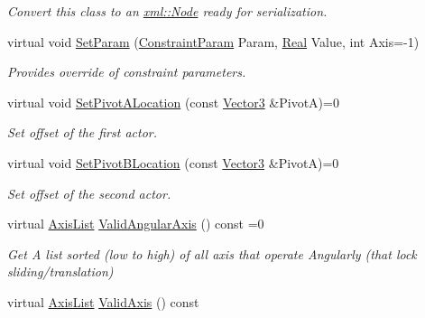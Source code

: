 \begin{DoxyCompactItemize}
\begin{DoxyCompactList}\small\item\em Convert this class to an \hyperlink{classMezzanine_1_1xml_1_1Node}{xml::Node} ready for serialization. \item\end{DoxyCompactList}\item 
virtual void \hyperlink{classMezzanine_1_1TypedConstraint_aacb29d66ce974798bbc902d49a3025cc}{SetParam} (\hyperlink{namespaceMezzanine_a6c62e8c2938fb203eb7a7072c12176f4}{ConstraintParam} Param, \hyperlink{namespaceMezzanine_a726731b1a7df72bf3583e4a97282c6f6}{Real} Value, int Axis=-\/1)
\begin{DoxyCompactList}\small\item\em Provides override of constraint parameters. \item\end{DoxyCompactList}\item 
virtual void \hyperlink{classMezzanine_1_1TypedConstraint_a09aacdc6f424623cc3a2fdad9c1d0caf}{SetPivotALocation} (const \hyperlink{classMezzanine_1_1Vector3}{Vector3} \&PivotA)=0
\begin{DoxyCompactList}\small\item\em Set offset of the first actor. \item\end{DoxyCompactList}\item 
virtual void \hyperlink{classMezzanine_1_1TypedConstraint_ad59aa55a0e4b8aa107db9c9460b57ec3}{SetPivotBLocation} (const \hyperlink{classMezzanine_1_1Vector3}{Vector3} \&PivotA)=0
\begin{DoxyCompactList}\small\item\em Set offset of the second actor. \item\end{DoxyCompactList}\item 
virtual \hyperlink{classMezzanine_1_1TypedConstraint_ac6b8e0839cd686f73d0c9e9ad5db47a4}{AxisList} \hyperlink{classMezzanine_1_1TypedConstraint_a09ecca761c4af51a8b41c056f6b15b30}{ValidAngularAxis} () const =0
\begin{DoxyCompactList}\small\item\em Get A list sorted (low to high) of all axis that operate Angularly (that lock sliding/translation) \item\end{DoxyCompactList}\item 
virtual \hyperlink{classMezzanine_1_1TypedConstraint_ac6b8e0839cd686f73d0c9e9ad5db47a4}{AxisList} \hyperlink{classMezzanine_1_1TypedConstraint_a6fa3f1ead5840ca22071c5f7dce30bbd}{ValidAxis} () const 

\end{DoxyCompactItemize}
